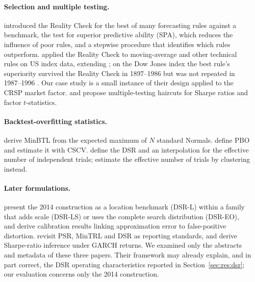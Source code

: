 \documentclass[11pt,a4paper]{article}
\theoremstyle{remark}
\begin{document}
\paragraph{Selection and multiple testing.} \citet{white2000} introduced the Reality Check for the best of many forecasting rules against a benchmark, \citet{hansen2005} the test for superior predictive ability (SPA), which reduces the influence of poor rules, and \citet{romano2005} a stepwise procedure that identifies which rules outperform. \citet{sullivan1999} applied the Reality Check to moving-average and other technical rules on US index data, extending \citet{brock1992}; on the Dow Jones index the best rule's superiority survived the Reality Check in 1897--1986 but was not repeated in 1987--1996 \citep[p.~37]{sullivan1999}. Our case study is a small instance of their design applied to the CRSP market factor. \citet{harvey2014evaluating,harvey2015backtesting} and \citet{harvey2016cross} propose multiple-testing haircuts for Sharpe ratios and factor $t$-statistics.

\paragraph{Backtest-overfitting statistics.} \citet{bailey2014pseudo} derive MinBTL from the expected maximum of $N$ standard Normals. \citet{bailey2017pbo} define PBO and estimate it with CSCV. \citet{bailey2014dsr} define the DSR and an interpolation for the effective number of independent trials; \citet{lopezdeprado2018lewis} estimate the effective number of trials by clustering instead.

\paragraph{Later formulations.} \citet{lopezdeprado2026porcu} present the 2014 construction as a location benchmark (DSR-L) within a family that adds scale (DSR-LS) or uses the complete search distribution (DSR-EO), and derive calibration results linking approximation error to false-positive distortion. \citet{lopezdeprado2026lipton} revisit PSR, MinTRL and DSR as reporting standards, and \citet{lopezdeprado2026garch} derive Sharpe-ratio inference under GARCH returns. We examined only the abstracts and metadata of these three papers. Their framework may already explain, and in part correct, the DSR operating characteristics reported in Section~\ref{sec:res:dsr}; our evaluation concerns only the 2014 construction.
\end{document}
